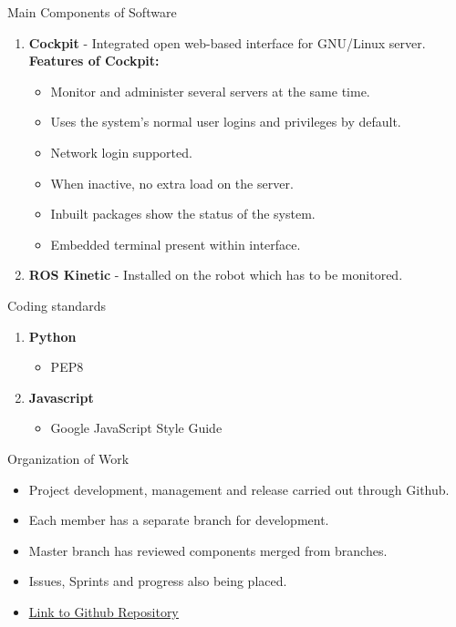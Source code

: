 \documentclass[aspectratio=169]{beamer}
\begin{document}
\begin{frame}{Main Components of Software}
\vspace*{-10mm}
\linespread{1.5}
\begin{enumerate}
	\item \textbf{Cockpit} - Integrated open web-based interface for GNU/Linux server.\\ \textbf{Features of Cockpit:}
	\begin{itemize}
	\item Monitor and administer several servers at the same time.
	\item Uses the system’s normal user logins and privileges by default. 
	\item Network login supported.
	\item When inactive, no extra load on the server.
	\item Inbuilt packages show the status of the system.
	\item Embedded terminal present within interface.
	\end{itemize}
	\item \justify \textbf{ROS Kinetic} - Installed on the robot which has to be monitored.
\end{enumerate}
	
\end{frame}

\begin{frame}{Coding standards}
\vspace*{-25mm}
\linespread{2}
\begin{enumerate}
	\item \textbf{Python}
	\begin{itemize}
	\item PEP8
	\end{itemize}
	\item \textbf{Javascript}
		\begin{itemize}
	\item Google JavaScript Style Guide
	\end{itemize}
\end{enumerate}
	
\end{frame}

\begin{frame}{Organization of Work}
\vspace*{-15mm}
\linespread{2}
	\begin{itemize}
	\item Project development, management and release carried out through Github.
	\item Each member has a separate branch for development.
	\item Master branch has reviewed components merged from branches.
	\item Issues, Sprints and progress also being placed.
	\item  \href{https://github.com/lokeshveeramacheneni/Software-Development-Project/tree/master}{\underline{Link to Github Repository}} 
	\end{itemize}
	
\end{frame}
\end{document}
